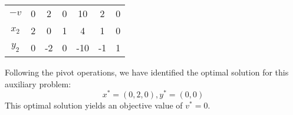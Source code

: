 \begin{example}
\begin{table}[H]
\begin{tabular}{ccccccc}
        \multicolumn{1}{c|}{$-v$}  & \multicolumn{1}{c|}{0} & 2     & 0     & \multicolumn{1}{c|}{10}  & 2     & \multicolumn{1}{c|}{0} \\ \cline{2-7} 
        \multicolumn{1}{c|}{$x_2$} & \multicolumn{1}{c|}{2} & 0     & 1     & \multicolumn{1}{c|}{4}   & 1     & \multicolumn{1}{c|}{0} \\
        \multicolumn{1}{c|}{$y_2$} & \multicolumn{1}{c|}{0} & -2    & 0     & \multicolumn{1}{c|}{-10} & -1    & \multicolumn{1}{c|}{1} \\ \cline{2-7} 
        \end{tabular}
    \end{table}
    Following the pivot operations, we have identified the optimal solution for this auxiliary problem:
    \[x^{*}=(0,2,0), y^{*}=(0,0)\]
    This optimal solution yields an objective value of $v^{*}=0$. 


\end{example}
